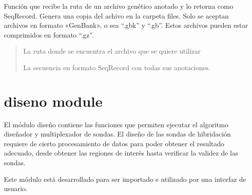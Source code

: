 \documentclass[letterpaper,10pt,spanish]{sphinxmanual}
\begin{document}
\begin{fulllineitems}
\label{\detokenize{descarga:descarga.parse_file_to_seqrecord}}
\pysigstartsignatures
{}
\pysigstopsignatures
\sphinxAtStartPar
Función que recibe la ruta de un archivo genético anotado y lo retorna como SeqRecord. Genera una copia
del achivo en la carpeta files. Solo se aceptan archivos en formato «GenBank», o sea “.gbk” y
“.gb”. Estos archivos pueden estar comprimidos en formato “.gz”.
\begin{quote}\begin{description}
\sphinxAtStartPar
{} \textendash{} La ruta donde se encuentra el archivo que se quiere utilizar

\sphinxAtStartPar
La secuencia en formato SeqRecord con todas sus anotaciones.

\end{description}\end{quote}

\end{fulllineitems}


\sphinxstepscope


\section{diseno module}
\label{\detokenize{diseno:diseno-module}}\label{\detokenize{diseno::doc}}
\sphinxAtStartPar
El módulo diseño contiene las funciones que permiten ejecutar el algoritmo diseñador y multiplexador de sondas. El diseño de las sondas de hibridación requiere de cierto procesamiento de datos para poder obtener el resultado adecuado, desde obtener las regiones de interés hasta verificar la validez de las sondas.

\sphinxAtStartPar
Este módulo está desarrollado para ser importado e utilizado por una interfaz de usuario.
\label{\detokenize{diseno:module-diseno}}
\end{document}
